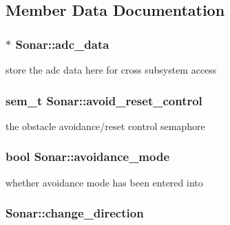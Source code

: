 \subsection{Member Data Documentation}
\hypertarget{classSonar_a9e2ea95994eefd09ec7546853ebf1cb7}{
\subsubsection[{adc\-\_\-data}]{$\ast$ Sonar\-::adc\-\_\-data\hspace{0.3cm}{\ttfamily [protected]}}}\label{classSonar_a9e2ea95994eefd09ec7546853ebf1cb7}
store the adc data here for cross subsystem access \hypertarget{classSonar_a6e842fc3ef4088c987a7a348df3b75ce}{
\subsubsection[{avoid\-\_\-reset\-\_\-control}]{\setlength{\rightskip}{0pt plus 5cm}sem\-\_\-t Sonar\-::avoid\-\_\-reset\-\_\-control\hspace{0.3cm}{\ttfamily [protected]}}}\label{classSonar_a6e842fc3ef4088c987a7a348df3b75ce}
the obstacle avoidance/reset control semaphore \hypertarget{classSonar_a72b11a8e569125119750ee9dd094141b}{
\subsubsection[{avoidance\-\_\-mode}]{\setlength{\rightskip}{0pt plus 5cm}bool Sonar\-::avoidance\-\_\-mode\hspace{0.3cm}{\ttfamily [protected]}}}\label{classSonar_a72b11a8e569125119750ee9dd094141b}
whether avoidance mode has been entered into \hypertarget{classSonar_a3db9cf5f86aab72001ae088b68c0936f}{
\subsubsection[{change\-\_\-direction}]{ Sonar\-::change\-\_\-direction\hspace{0.3cm}{\ttfamily [protected]}}}\label{classSonar_a3db9cf5f86aab72001ae088b68c0936f}

